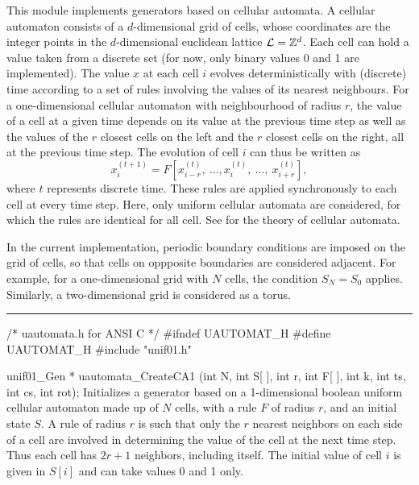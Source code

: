 
This module implements generators based on cellular automata. A cellular
automaton consists of a $d$-dimensional grid of cells, whose coordinates are 
the integer points in the \mbox{$d$-dimensional} euclidean lattice
 ${\cal L} = \mathbb{Z}^d$. Each cell can hold a value taken from a discrete
 set (for now, only binary values 0 and 1 are implemented).
The value $x$ at each cell $i$ evolves deterministically with (discrete)
 time according
to a set of rules involving the values of its nearest neighbours. For a 
one-dimensional cellular automaton with neighbourhood of radius $r$, the value
 of a cell at a given time depends on its value at the previous time
 step  as well as the values of the $r$ closest cells on
 the left and  the $r$ closest cells on the right, all at the previous time
 step. The evolution of cell $i$ can thus be written as
$$
   x_i^{(t+1)} = F\left[ x_{i-r}^{(t)},\ \ldots, x_{i}^{(t)},\  \ldots,
                 \ x_{i+r}^{(t)}\right],
$$
where $t$ represents discrete time.
These rules are applied synchronously to each cell at every time step.
Here, only uniform cellular automata are considered, for which the rules 
are identical for all cell.
See \cite{rWOL86a,rWOL86b,rTOM99a}
for the theory of  cellular automata.

In the current implementation,
periodic boundary conditions are imposed on the grid of cells, so that
 cells on oppposite boundaries are considered adjacent. For example, for a
one-dimensional grid with $N$ cells, the condition $S_N = S_0$ applies.
Similarly, a two-dimensional grid is considered as a torus.



\bigskip
\hrule
\code\hide
/* uautomata.h for ANSI C */
#ifndef UAUTOMAT_H
#define UAUTOMAT_H
\endhide
#include "unif01.h"

unif01_Gen * uautomata_CreateCA1 (int N, int S[ ], int r, int F[ ],
                                  int k, int ts, int cs, int rot);
\endcode
  \tab  Initializes a generator based on a 1-dimensional boolean uniform
 cellular automaton made up of $N$ cells, with a rule $F$ of radius $r$,
 and an initial state $S$. A rule of radius $r$ is such that only the $r$ 
 nearest neighbors on each side of a cell are involved in determining the
 value of the cell at the next time step. Thus each cell has $2r+1$ 
 neighbors, including itself. 
 The initial value of cell $i$ is given in $S[i]$ and can take
%
 values 0 and 1 only.

